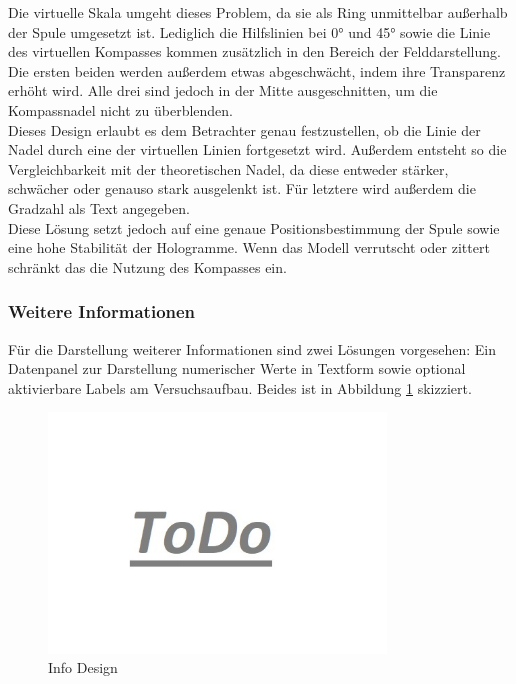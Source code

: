 Die virtuelle Skala umgeht dieses Problem, da sie als Ring unmittelbar außerhalb der Spule umgesetzt ist. Lediglich die Hilfslinien bei 0° und 45° sowie die Linie des virtuellen Kompasses kommen zusätzlich in den Bereich der Felddarstellung. Die ersten beiden werden außerdem etwas abgeschwächt, indem ihre Transparenz erhöht wird. Alle drei sind jedoch in der Mitte ausgeschnitten, um die Kompassnadel nicht zu überblenden.\\

Dieses Design erlaubt es dem Betrachter genau festzustellen, ob die Linie der Nadel durch eine der virtuellen Linien fortgesetzt wird. Außerdem entsteht so die Vergleichbarkeit mit der theoretischen Nadel, da diese entweder stärker, schwächer oder genauso stark ausgelenkt ist. Für letztere wird außerdem die Gradzahl als Text angegeben.\\

Diese Lösung setzt jedoch auf eine genaue Positionsbestimmung der Spule sowie eine hohe Stabilität der Hologramme. Wenn das Modell verrutscht oder zittert schränkt das die Nutzung des Kompasses ein.

\subsubsection{Weitere Informationen} 
\label{sec-4-2-5}
Für die Darstellung weiterer Informationen sind zwei Lösungen vorgesehen: Ein Datenpanel zur Darstellung numerischer Werte in Textform sowie optional aktivierbare Labels am Versuchsaufbau. Beides ist in Abbildung \ref{img:info-design} skizziert.


\begin{figure}[h!]
	\centering
	\includegraphics[width=0.8\textwidth]{images/todo.jpg}
	\caption{Info Design}
	\label{img:info-design}
\end{figure}

